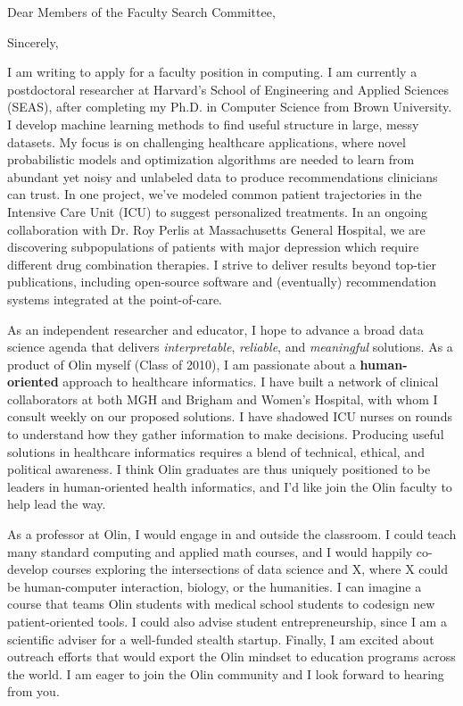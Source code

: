 \documentclass[11pt,letterpaper,roman]{moderncv}        %
\begin{document}
\date{October 28, 2017}
\opening{Dear Members of the Faculty Search Committee,}
\closing{Sincerely,}
\makelettertitle

I am writing to apply for a faculty position in computing.
I am currently a postdoctoral researcher at Harvard's School of Engineering and Applied Sciences (SEAS), after completing my Ph.D. in Computer Science from Brown University.
I develop machine learning methods 
to find useful structure in large, messy datasets.
My focus is on challenging healthcare applications, where novel probabilistic models and optimization algorithms are needed to learn from abundant yet  noisy and unlabeled data to produce recommendations clinicians can trust.
In one project, we've modeled common patient trajectories in the Intensive Care Unit (ICU) to suggest personalized treatments. In an ongoing collaboration with Dr. Roy Perlis at Massachusetts General Hospital, we are discovering subpopulations of patients with major depression which require different drug combination therapies. 
I strive to deliver results beyond top-tier publications, including open-source software and (eventually) recommendation systems integrated at the point-of-care. 

As an independent researcher and educator, I hope to advance a broad data science agenda that delivers \emph{interpretable}, \emph{reliable}, and \emph{meaningful} solutions. As a product of Olin myself (Class of 2010), I am passionate about a \textbf{human-oriented} approach to healthcare informatics. I have built a network of clinical collaborators at both MGH and Brigham and Women's Hospital, with whom I consult weekly on our proposed solutions. I have shadowed ICU nurses on rounds to understand how they gather information to make decisions. Producing useful solutions in healthcare informatics requires a blend of technical, ethical, and political awareness. I think Olin graduates are thus uniquely positioned to be leaders in human-oriented health informatics, and I'd like join the Olin faculty to help lead the way.

As a professor at Olin, I would engage in and outside the classroom. I could teach many standard computing and applied math courses, and I would happily co-develop courses exploring the intersections of data science and X, where X could be human-computer interaction, biology, or the humanities. I can imagine a course that teams Olin students with medical school students to codesign new patient-oriented tools.
I could also advise student entrepreneurship, 
since I am a scientific adviser for a well-funded stealth startup. Finally, I am excited about outreach efforts that would export the Olin mindset to education programs across the world. I am eager to join the Olin community and I look forward to hearing from you.

\makeletterclosing
\end{document}
